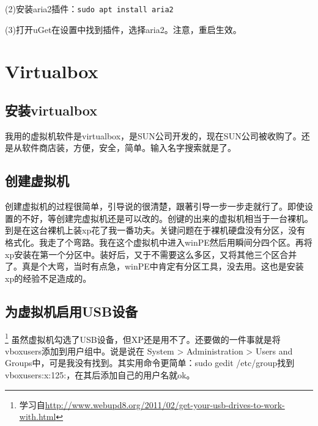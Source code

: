 (2)安装aria2插件：\verb|sudo apt install aria2|

(3)打开uGet在设置中找到插件，选择aria2。注意，重启生效。





\section{Virtualbox}
\subsection{安装virtualbox}
    我用的虚拟机软件是virtualbox，是SUN公司开发的，现在SUN公司被收购了。还是从软件商店装，方便，安全，简单。输入名字搜索就是了。
\subsection{创建虚拟机}
    创建虚拟机的过程很简单，引导说的很清楚，跟著引导一步一步走就行了。即使设置的不好，等创建完虚拟机还是可以改的。创键的出来的虚拟机相当于一台裸机。到是在这台裸机上装xp花了我一番功夫。关键问题在于裸机硬盘没有分区，没有格式化。我走了个弯路。我在这个虚拟机中进入winPE然后用瞬间分四个区。再将xp安装在第一个分区中。装好后，又于不需要这么多区，又将其他三个区合并了。真是个大弯，当时有点急，winPE中肯定有分区工具，没去用。这也是安装xp的经验不足造成的。


\subsection{为虚拟机启用USB设备}
 \footnote{学习自\url{http://www.webupd8.org/2011/02/get-your-usb-drives-to-work-with.html}}
    虽然虚拟机勾选了USB设备，但XP还是用不了。还要做的一件事就是将 vboxusers添加到用户组中。说是说在 System > Administration > Users and Groups中，可是我没有找到。其实用命令更简单：sudo gedit /etc/group找到vboxusers:x:125:，在其后添加自己的用户名就ok。


